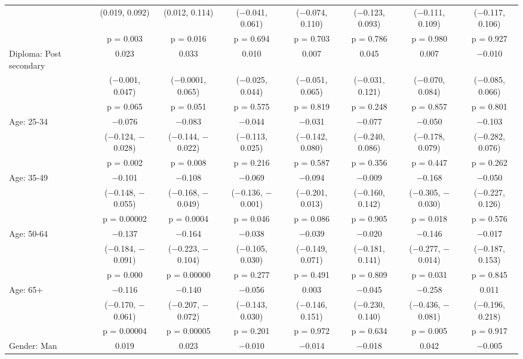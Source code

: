 \begin{tabular}{@{\extracolsep{5pt}}lccccccc}
  & (0.019, 0.092) & (0.012, 0.114) & ($-$0.041, 0.061) & ($-$0.074, 0.110) & ($-$0.123, 0.093) & ($-$0.111, 0.109) & ($-$0.117, 0.106) \\ 
  & p = 0.003 & p = 0.016 & p = 0.694 & p = 0.703 & p = 0.786 & p = 0.980 & p = 0.927 \\ 
  Diploma: Post secondary & 0.023 & 0.033 & 0.010 & 0.007 & 0.045 & 0.007 & $-$0.010 \\ 
  & ($-$0.001, 0.047) & ($-$0.0001, 0.065) & ($-$0.025, 0.044) & ($-$0.051, 0.065) & ($-$0.031, 0.121) & ($-$0.070, 0.084) & ($-$0.085, 0.066) \\ 
  & p = 0.065 & p = 0.051 & p = 0.575 & p = 0.819 & p = 0.248 & p = 0.857 & p = 0.801 \\ 
  Age: 25-34 & $-$0.076 & $-$0.083 & $-$0.044 & $-$0.031 & $-$0.077 & $-$0.050 & $-$0.103 \\ 
  & ($-$0.124, $-$0.028) & ($-$0.144, $-$0.022) & ($-$0.113, 0.025) & ($-$0.142, 0.080) & ($-$0.240, 0.086) & ($-$0.178, 0.079) & ($-$0.282, 0.076) \\ 
  & p = 0.002 & p = 0.008 & p = 0.216 & p = 0.587 & p = 0.356 & p = 0.447 & p = 0.262 \\ 
  Age: 35-49 & $-$0.101 & $-$0.108 & $-$0.069 & $-$0.094 & $-$0.009 & $-$0.168 & $-$0.050 \\ 
  & ($-$0.148, $-$0.055) & ($-$0.168, $-$0.049) & ($-$0.136, $-$0.001) & ($-$0.201, 0.013) & ($-$0.160, 0.142) & ($-$0.305, $-$0.030) & ($-$0.227, 0.126) \\ 
  & p = 0.00002 & p = 0.0004 & p = 0.046 & p = 0.086 & p = 0.905 & p = 0.018 & p = 0.576 \\ 
  Age: 50-64 & $-$0.137 & $-$0.164 & $-$0.038 & $-$0.039 & $-$0.020 & $-$0.146 & $-$0.017 \\ 
  & ($-$0.184, $-$0.091) & ($-$0.223, $-$0.104) & ($-$0.105, 0.030) & ($-$0.149, 0.071) & ($-$0.181, 0.141) & ($-$0.277, $-$0.014) & ($-$0.187, 0.153) \\ 
  & p = 0.000 & p = 0.00000 & p = 0.277 & p = 0.491 & p = 0.809 & p = 0.031 & p = 0.845 \\ 
  Age: 65+ & $-$0.116 & $-$0.140 & $-$0.056 & 0.003 & $-$0.045 & $-$0.258 & 0.011 \\ 
  & ($-$0.170, $-$0.061) & ($-$0.207, $-$0.072) & ($-$0.143, 0.030) & ($-$0.146, 0.151) & ($-$0.230, 0.140) & ($-$0.436, $-$0.081) & ($-$0.196, 0.218) \\ 
  & p = 0.00004 & p = 0.00005 & p = 0.201 & p = 0.972 & p = 0.634 & p = 0.005 & p = 0.917 \\ 
  Gender: Man & 0.019 & 0.023 & $-$0.010 & $-$0.014 & $-$0.018 & 0.042 & $-$0.005 \\ 

\end{tabular}

